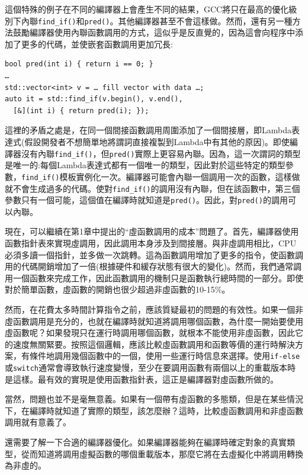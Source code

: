 這個特殊的例子在不同的編譯器上會產生不同的結果，GCC將只在最高的優化級別下內聯\texttt{find\_if()}和\texttt{pred()}。其他編譯器甚至不會這樣做。然而，還有另一種方法鼓勵編譯器使用內聯函數調用的方式，這似乎是反直覺的，因為這會向程序中添加了更多的代碼，並使嵌套函數調用更加冗長:

\begin{lstlisting}[style=styleCXX]
bool pred(int i) { return i == 0; }
… 
std::vector<int> v = … fill vector with data …;
auto it = std::find_if(v.begin(), v.end(), 
  [&](int i) { return pred(i); });
\end{lstlisting}

這裡的矛盾之處是，在同一個間接函數調用周圍添加了一個間接層，即Lambda表達式(假設開發者不想簡單地將謂詞直接複製到Lambda中有其他的原因)。即使編譯器沒有內聯\texttt{find\_if()}，但\texttt{pred()}實際上更容易內聯。因為，這一次謂詞的類型是唯一的:每個Lambda表達式都有一個唯一的類型，因此對於這些特定的類型參數，\texttt{find\_if()}模板實例化一次。編譯器可能會內聯一個調用一次的函數，這樣做就不會生成過多的代碼。使對\texttt{find\_if()}的調用沒有內聯，但在該函數中，第三個參數只有一個可能，這個值在編譯時就知道是\texttt{pred()}。因此，對\texttt{pred()}的調用可以內聯。

現在，可以繼續在第1章中提出的“虛函數調用的成本”問題了。首先，編譯器使用函數指針表來實現虛調用，因此調用本身涉及到間接層。與非虛調用相比，CPU必須多讀一個指針，並多做一次跳轉。這為函數調用增加了更多的指令，使函數調用的代碼開銷增加了一倍(根據硬件和緩存狀態有很大的變化)。然而，我們通常調用一個函數來完成工作，因此函數調用的機制只是函數執行總時間的一部分。即使對於簡單函數，虛函數的開銷也很少超過非虛函數的10-15\%。

然而，在花費太多時間計算指令之前，應該質疑最初的問題的有效性。如果一個非虛函數調用是充分的，也就在編譯時就知道將調用哪個函數，為什麼一開始要使用虛函數呢？如果發現只在運行時調用哪個函數，就根本不能使用非虛函數，因此它的速度無關緊要。按照這個邏輯，應該比較虛函數調用和函數等價的運行時解決方案，有條件地調用幾個函數中的一個，使用一些運行時信息來選擇。使用\texttt{if-else}或\texttt{switch}通常會導致執行速度變慢，至少在要調用函數有兩個以上的重載版本時是這樣。最有效的實現是使用函數指針表，這正是編譯器對虛函數所做的。

當然，問題也並不是毫無意義。如果有一個帶有虛函數的多態類，但是在某些情況下，在編譯時就知道了實際的類型，該怎麼辦？這時，比較虛函數調用和非虛函數調用就有意義了。

還需要了解一下合適的編譯器優化。如果編譯器能夠在編譯時確定對象的真實類型，從而知道將調用虛擬函數的哪個重載版本，那麼它將在去虛擬化中將調用轉換為非虛的。

